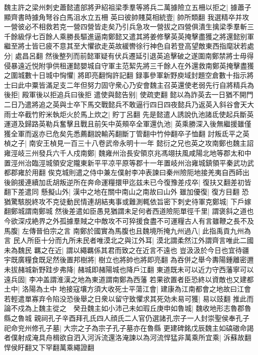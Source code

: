 魏主許之梁州刺史蕭懿遣部將尹紹祖梁季羣等將兵二萬據險立五柵以拒之|{
	據蕭子顯齊書時據角弩谷白馬沮水立五柵}
英曰彼帥賤莫相統壹|{
	帥所類翻}
我選精卒并攻一營彼必不相救若克一營四營皆走矣乃引兵急攻一營拔之四營俱潰生擒梁季羣斬三千餘級俘七百餘人乘勝長驅進逼南鄭懿又遣其將姜修擊英英掩擊盡獲之將還懿别軍繼至將士皆已疲不意其至大懼欲走英故緩轡徐行神色自若登高望敵東西指麾狀若處分|{
	處昌呂翻}
然後整列而前懿軍疑有伏兵遷延引退英追擊破之遂圍南鄭禁將士毋得侵暴遠近悦附爭供租運懿嬰城自守軍主范絜先將三千餘人在外還救南鄭英掩擊盡獲之圍城數十日城中恟懼|{
	將即亮翻恟許記翻}
録事參軍新野庾域封題空倉數十指示將士曰此中粟皆滿足支二年但努力固守衆心乃安會魏主召英還使老弱先行自將精兵為後拒|{
	殿軍後以拒追兵曰後拒}
遣使與懿告别|{
	使疏吏翻}
懿以為詐英去一日猶不開門二日乃遣將追之英與士卒下馬交戰懿兵不敢逼行四日四夜懿兵乃返英入斜谷會天大雨士卒截竹貯米執炬火於馬上炊之|{
	貯丁呂翻}
先是懿遣人誘說仇池諸氐使起兵斷英運道及歸路英勒兵奮擊且戰且前矢中英頰卒全軍還仇池|{
	英乘勝深入後無繼援雖僅獲全軍而返亦已危矣先悉薦翻說輸芮翻斷丁管翻中竹仲翻卒子恤翻}
討叛氐平之英楨之子|{
	南安王楨見一百三十八卷武帝永明十一年}
懿衍之兄也英之攻南鄭也魏主詔雍涇岐三州發兵六千人戍南鄭|{
	魏雍州治長安領京兆馮翊扶風咸陽北地等郡太和中置涇州治臨涇城領安定隴東新平平凉平原等郡十一年置岐州治雍城鎮領平秦武功武都郡雍於用翻}
俟克城則遣之侍中兼左僕射李冲表諫曰秦州險阨地接羌夷自西師出後餉援連續加氐胡叛逆所在奔命運糧擐甲迄兹未已今復豫差戍卒|{
	復扶又翻差初皆翻下差遣同}
懸擬山外|{
	漢中之地在關中南山之南故曰山外}
雖加優復|{
	復方目翻}
恐猶驚駭脱終攻不克徒動民情連胡結夷事或難測輒依旨密下刺史待軍克鄭城|{
	下戶嫁翻鄭城謂南鄭城}
然後差遣如臣愚見猶謂未足何者西道險阨單徑千里|{
	謂褒斜之道也}
今欲深戍絶界之外孤據羣賊之中敵攻不可猝援食盡不可運糧古人有言雖鞭之長不及馬腹|{
	左傳晉伯宗之言}
南鄭於國實為馬腹也且魏境所掩九州過八|{
	此指禹貢九州為言}
民人所臣十分而九所未民者唯漠北之與江外耳|{
	漠北謂柔然江外謂齊言唯此二國未為魏民}
羈之在近|{
	謂以繩羈係其君而致之在近言不遠也}
豈汲汲於今日也宜待疆宇既廣糧食既足然後置邦樹將|{
	樹立也將帥也將即亮翻}
為吞併之舉今夀陽鍾離密邇未拔赭城新野跬步弗降|{
	赭城即赭陽城也降戶江翻}
東道既未可以近力守西藩寧可以遠兵固|{
	李冲盖謂淮漢之地為東道謂南鄭為西藩}
若果欲置者臣恐終以資敵也又建都土中|{
	洛陽為土中}
地接寇壤方須大收死士平蕩江會|{
	建康為江南都會之地故曰江會}
若輕遣單寡弃令陷没恐後舉之日衆以留守致懼求其死効未易可獲|{
	易以豉翻}
推此而論不戍為上魏主從之　癸丑魏主如小沛己未如瑕丘庚申如魯城|{
	魏收地形志魯郡魯縣之魯城}
親祠孔子辛酉拜孔氏四人顔氏二人官仍選諸孔宗子一人封崇聖侯奉孔子祀命兖州修孔子墓|{
	大宗之子為宗子孔子墓亦在魯縣}
更建碑銘戊辰魏主如碻磝命謁者僕射成淹具舟楫欲自泗入河泝流還洛淹諫以為河流悍猛非萬乘所宜乘|{
	泝蘇故翻悍侯盱翻又下罕翻萬乘繩證翻}

